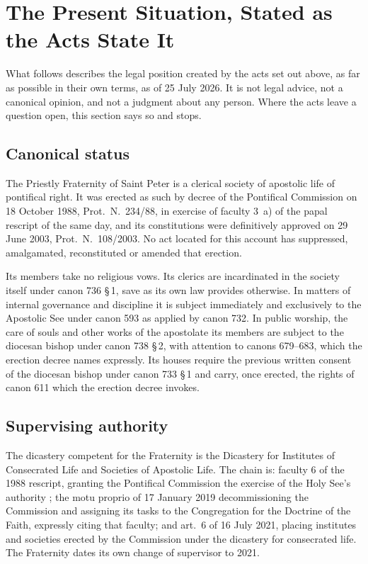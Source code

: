 \section{The Present Situation, Stated as the Acts State It}

What follows describes the legal position created by the acts set out
above, as far as possible in their own terms, as of 25 July 2026. It is
not legal advice, not a canonical opinion, and not a judgment about any
person. Where the acts leave a question open, this section says so and
stops.

\subsection{Canonical status}

The Priestly Fraternity of Saint Peter is a clerical society of apostolic
life of pontifical right. It was erected as such by decree of the
Pontifical Commission  on 18 October 1988,
Prot.\ N.~234/88, in exercise of faculty 3~a) of the papal rescript
 of the same day, and its constitutions were
definitively approved on 29 June 2003, Prot.\ N.~108/2003. No act located
for this account has suppressed, amalgamated, reconstituted or amended
that erection.

Its members take no religious vows. Its clerics are incardinated in the
society itself under canon 736 §\,1, save as its own law provides
otherwise. In matters of internal governance and discipline it is subject
immediately and exclusively to the Apostolic See under canon 593 as
applied by canon 732. In public worship, the care of souls and other works
of the apostolate its members are subject to the diocesan bishop under
canon 738 §\,2, with attention to canons 679--683, which the erection
decree names expressly. Its houses require the previous written consent of
the diocesan bishop under canon 733 §\,1 and carry, once erected, the
rights of canon 611 which the erection decree invokes.

\subsection{Supervising authority}

The dicastery competent for the Fraternity is the Dicastery for
Institutes of Consecrated Life and Societies of Apostolic Life. The chain
is: faculty 6 of the 1988 rescript, granting the Pontifical Commission
the exercise of the Holy See's authority ;
the motu proprio of 17 January 2019 decommissioning the Commission and
assigning its tasks to the Congregation for the Doctrine of the Faith,
expressly citing that faculty; and  art.~6 of
16 July 2021, placing institutes and societies erected by the Commission
under the dicastery for consecrated life. The Fraternity dates its own
change of supervisor to 2021.

